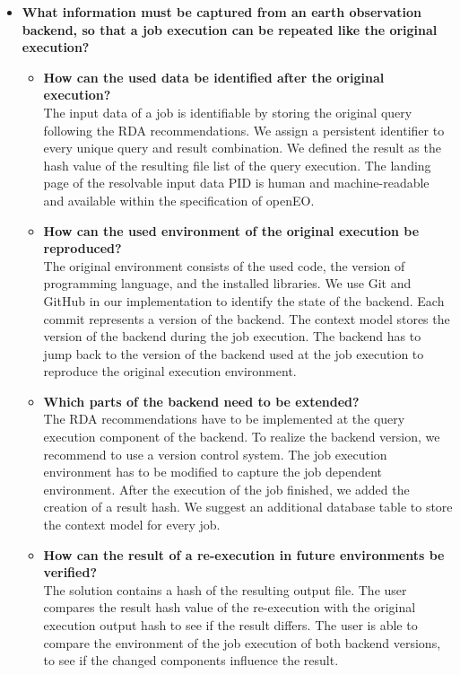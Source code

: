 \documentclass[draft,final]{vutinfth} %
\begin{document}
\begin{itemize}
	\item \textbf{What information must be captured from an earth observation backend, so that a job execution can be repeated like the original execution?}
	\begin{itemize}
		\item \textbf{How can the used data be identified after the original execution?} \\
		The input data of a job is identifiable by storing the original query following the RDA recommendations. We assign a persistent identifier to every unique query and result combination. We defined the result as the hash value of the resulting file list of the query execution. The landing page of the resolvable input data PID is human and machine-readable and available within the specification of openEO.  
		\item \textbf{How can the used environment of the original execution be reproduced?} \\
		The original environment consists of the used code, the version of programming language, and the installed libraries. We use Git and GitHub in our implementation to identify the state of the backend. Each commit represents a version of the backend. The context model stores the version of the backend during the job execution. The backend has to jump back to the version of the backend used at the job execution to reproduce the original execution environment.       
		\item \textbf{Which parts of the backend need to be extended?} \\
		The RDA recommendations have to be implemented at the query execution component of the backend. To realize the backend version, we recommend to use a version control system. The job execution environment has to be modified to capture the job dependent environment. After the execution of the job finished, we added the creation of a result hash. We suggest an additional database table to store the context model for every job.
		\item \textbf{How can the result of a re-execution in future environments be verified?} \\
		The solution contains a hash of the resulting output file. The user compares the result hash value of the re-execution with the original execution output hash to see if the result differs. The user is able to compare the environment of the job execution of both backend versions, to see if the changed components influence the result.   

\end{itemize}
\end{itemize}
\end{document}
